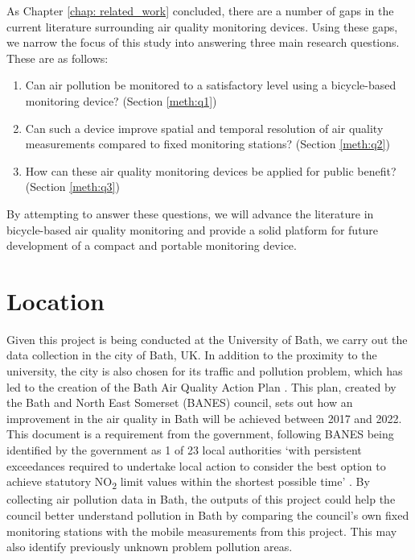 \documentclass[11pt]{report}
\begin{document}
As Chapter \ref{chap: related_work} concluded, there are a number of gaps in the current literature surrounding air quality monitoring devices. Using these gaps, we narrow the focus of this study into answering three main research questions. These are as follows:
\begin{enumerate}
\item Can air pollution be monitored to a satisfactory level using a bicycle-based monitoring device? (Section \ref{meth:q1})
%
%
\item Can such a device improve spatial and temporal resolution of air quality measurements compared to fixed monitoring stations? (Section \ref{meth:q2})
\item How can these air quality monitoring devices be applied for public benefit? (Section \ref{meth:q3})
% 
\end{enumerate}

By attempting to answer these questions, we will advance the literature in bicycle-based air quality monitoring and provide a solid platform for future development of a compact and portable monitoring device.



\section{Location} \label{location}

Given this project is being conducted at the University of Bath, we carry out the data collection in the city of Bath, UK. In addition to the proximity to the university, the city is also chosen for its traffic and pollution problem, which has led to the creation of the Bath Air Quality Action Plan \citep{BANES2017baqap}. This plan, created by the Bath and North East Somerset (BANES) council, sets out how an improvement in the air quality in Bath will be achieved between 2017 and 2022. This document is a requirement from the government, following BANES being identified by the government as 1 of 23 local authorities `with persistent exceedances required to undertake local action to consider the best option to achieve statutory NO\textsubscript{2} limit values within the shortest possible time' \citep{DEFRA2017uknoxplan}. By collecting air pollution data in Bath, the outputs of this project could help the council better understand pollution in Bath by comparing the council's own fixed monitoring stations with the mobile measurements from this project. This may also identify previously unknown problem pollution areas.
\end{document}
